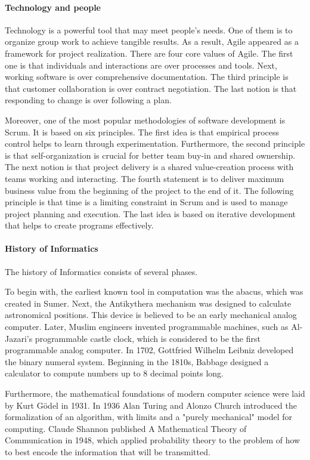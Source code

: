 \documentclass[12pt,twoside,english,a4paper]{article}
\begin{document}

\paragraph{Technology and people}
Technology is a powerful tool that may meet people's needs. One of them is to organize group work to achieve tangible results. As a result, Agile appeared as a framework for project realization. There are four core values of Agile. The first one is that individuals and interactions are over processes and tools. Next, working software is over comprehensive documentation. The third principle is that customer collaboration is over contract negotiation. The last notion is that responding to change is over following a plan.

Moreover, one of the most popular methodologies of software development is Scrum. It is based on six principles. The first idea is that empirical process control helps to learn through experimentation. Furthermore, the second principle is that self-organization is crucial for better team buy-in and shared ownership. The next notion is that project delivery is a shared value-creation process with teams working and interacting. The fourth statement is to deliver maximum business value from the beginning of the project to the end of it. The following principle is that time is a limiting constraint in Scrum and is used to manage project planning and execution. The last idea is based on iterative development that helps to create programs effectively.
\paragraph{History of Informatics}
The history of Informatics consists of several phases.

To begin with, the earliest known tool in computation was the abacus, which was created in Sumer. Next, the Antikythera mechanism was designed to calculate astronomical positions. This device is believed to be an early mechanical analog computer. Later, Muslim engineers invented programmable machines, such as Al-Jazari's programmable castle clock, which is considered to be the first programmable analog computer. In 1702, Gottfried Wilhelm Leibniz developed the binary numeral system. Beginning in the 1810s, Babbage designed a calculator to compute numbers up to 8 decimal points long.

Furthermore, the mathematical foundations of modern computer science were laid by Kurt Gödel in 1931. In 1936 Alan Turing and Alonzo Church introduced the formalization of an algorithm, with limits and a "purely mechanical" model for computing. Claude Shannon published A Mathematical Theory of Communication in 1948, which applied probability theory to the problem of how to best encode the information that will be transmitted. 
\end{document}

